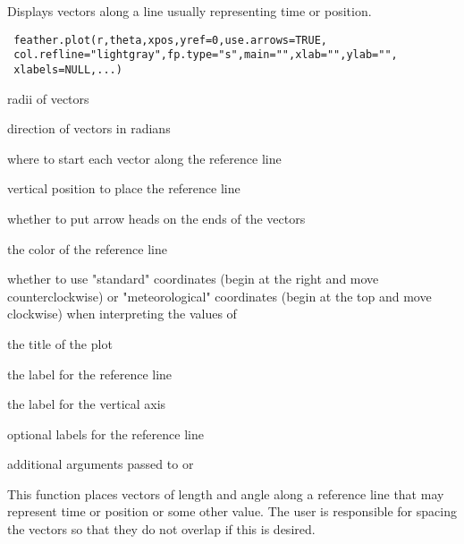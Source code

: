 \begin{Description}\relax
Displays vectors along a line usually representing time or position.
\end{Description}
\begin{Usage}
\begin{verbatim}
 feather.plot(r,theta,xpos,yref=0,use.arrows=TRUE,
 col.refline="lightgray",fp.type="s",main="",xlab="",ylab="",
 xlabels=NULL,...)
\end{verbatim}
\end{Usage}
\begin{Arguments}
\begin{ldescription}
\item[\code{r}] radii of vectors
\item[\code{theta}] direction of vectors in radians
\item[\code{xpos}] where to start each vector along the reference line
\item[\code{yref}] vertical position to place the reference line
\item[\code{use.arrows}] whether to put arrow heads on the ends of the vectors
\item[\code{col.refline}] the color of the reference line
\item[\code{fp.type}] whether to use "standard" coordinates (begin at the
right and move counterclockwise) or "meteorological" coordinates
(begin at the top and move clockwise) when interpreting the values
of 
\item[\code{main}] the title of the plot
\item[\code{xlab}] the label for the reference line
\item[\code{ylab}] the label for the vertical axis
\item[\code{xlabels}] optional labels for the reference line
\item[\code{...}] additional arguments passed to  or 
\end{ldescription}
\end{Arguments}
\begin{Details}\relax
This function places vectors of length  and angle  
along a reference line that may represent time or position or some other
value. The user is responsible for spacing the vectors so that they do
not overlap if this is desired.
\end{Details}
